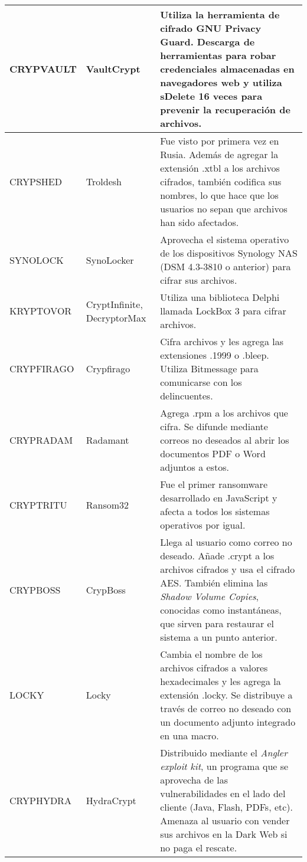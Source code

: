 {\begin{longtable}{|p{}|p{}|p{}|}
    CRYPVAULT &
    VaultCrypt &
    Utiliza la herramienta de cifrado GNU Privacy Guard. Descarga de herramientas para robar credenciales almacenadas en navegadores web y utiliza sDelete 16 veces para prevenir la recuperación de archivos.\\
\hline
    CRYPSHED & 
    Troldesh &
    Fue visto por primera vez en Rusia. Además de agregar la extensión .xtbl a los archivos cifrados, también codifica sus nombres, lo que hace que los usuarios no sepan que archivos han sido afectados.\\
\hline
     
    SYNOLOCK &
    SynoLocker &
    Aprovecha el sistema operativo de los dispositivos Synology \gls{NAS} (\gls{DSM} 4.3-3810 o anterior) para cifrar sus archivos.\\
\hline
    KRYPTOVOR & 
    CryptInfinite, DecryptorMax &
    Utiliza una biblioteca Delphi llamada LockBox 3 para cifrar archivos.\\
\hline
     
    CRYPFIRAGO &
    Crypfirago &
    Cifra archivos y les agrega las extensiones .1999 o .bleep. Utiliza Bitmessage para comunicarse con los delincuentes.\\
\hline
    CRYPRADAM & 
    Radamant &
    Agrega .rpm a los archivos que cifra. Se difunde mediante correos no deseados al abrir los documentos PDF o Word adjuntos a estos. \cite{18}\\
\hline
     
    CRYPTRITU &
    Ransom32 &
    Fue el primer ransomware desarrollado en JavaScript y afecta a todos los sistemas operativos por igual. \cite{19}\\
\hline
    CRYPBOSS & 
    CrypBoss &
    Llega al usuario como correo no deseado. Añade .crypt a los archivos cifrados y usa el cifrado \gls{AES}. También elimina las \textit{Shadow Volume Copies}, conocidas como instantáneas, que sirven para restaurar el sistema a un punto anterior. \cite{20}\\
\hline
     
    LOCKY &
    Locky &
    Cambia el nombre de los archivos cifrados a valores hexadecimales y les agrega la extensión .locky. Se distribuye a través de correo no deseado con un documento adjunto integrado en una macro.\\ 
\hline
    CRYPHYDRA & 
    HydraCrypt &
    Distribuido mediante el \textit{Angler exploit kit}, un programa que se aprovecha de las vulnerabilidades en el lado del cliente (Java, Flash, PDFs, etc). Amenaza al usuario con vender sus archivos en la Dark Web si no paga el rescate. \cite{21}\\
\hline
     

\end{longtable}}
